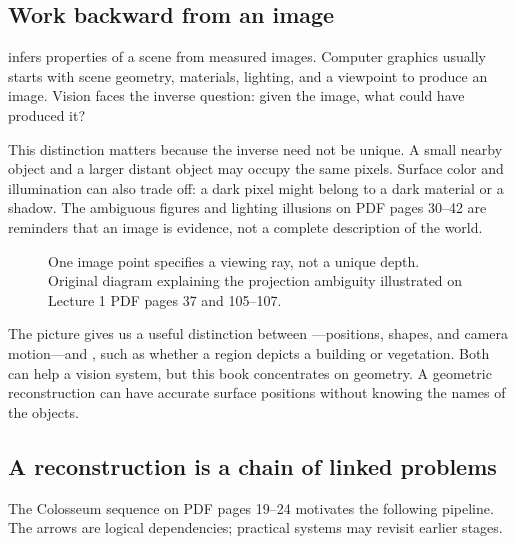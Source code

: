 \documentclass[letterpaper,11pt,english,openany,oneside]{jupyterBook}
\begin{document}
\subsection{Work backward from an image}
\label{\detokenize{lectures/lecture01/motivation:work-backward-from-an-image}}
\sphinxAtStartPar
{} infers properties of a scene from measured images. Computer graphics usually starts with scene geometry, materials, lighting, and a viewpoint to produce an image. Vision faces the inverse question: given the image, what could have produced it?

\sphinxAtStartPar
This distinction matters because the inverse need not be unique. A small nearby object and a larger distant object may occupy the same pixels. Surface color and illumination can also trade off: a dark pixel might belong to a dark material or a shadow. The ambiguous figures and lighting illusions on PDF pages 30–42 are reminders that an image is evidence, not a complete description of the world.

\begin{figure}[H]
\centering
\capstart

\noindent{}
\caption{One image point specifies a viewing ray, not a unique depth. Original diagram explaining the projection ambiguity illustrated on Lecture 1 PDF pages 37 and 105–107.}\label{\detokenize{lectures/lecture01/motivation:fig-lec01-ambiguity}}\end{figure}

\sphinxAtStartPar
The picture gives us a useful distinction between —positions, shapes, and camera motion—and , such as whether a region depicts a building or vegetation. Both can help a vision system, but this book concentrates on geometry. A geometric reconstruction can have accurate surface positions without knowing the names of the objects.

\ignorespaces
{}\ignorespaces
{}\ignorespaces

\subsection{A reconstruction is a chain of linked problems}
\label{\detokenize{lectures/lecture01/motivation:a-reconstruction-is-a-chain-of-linked-problems}}\label{\detokenize{lectures/lecture01/motivation:index-2}}\label{\detokenize{lectures/lecture01/motivation:index-1}}\label{\detokenize{lectures/lecture01/motivation:index-0}}
\sphinxAtStartPar
The Colosseum sequence on PDF pages 19–24 motivates the following pipeline. The arrows are logical dependencies; practical systems may revisit earlier stages.
\end{document}
